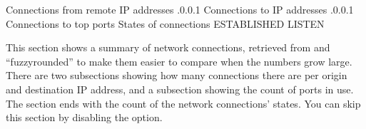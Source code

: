 \documentclass[letterpaper,10pt,english]{sphinxmanual}
\begin{document}
\begin{sphinxVerbatim}[commandchars=\\\{\}]
  Connections from remote IP addresses
    .0.0.1           
  Connections to  IP addresses
    .0.0.1           
  Connections to top   ports
                   
                   
  States of connections
    ESTABLISHED         
    LISTEN              
\end{sphinxVerbatim}

\sphinxAtStartPar
This section shows a summary of network connections, retrieved from 
and “fuzzy\sphinxhyphen{}rounded” to make them easier to compare when the numbers grow large.
There are two sub\sphinxhyphen{}sections showing how many connections there are per origin
and destination IP address, and a sub\sphinxhyphen{}section showing the count of ports in
use.  The section ends with the count of the network connections’ states.  You
can skip this section by disabling the {\hyperref[\detokenize{mariadb-system-summary:cmdoption-mariadb-system-summary-summarize-network}]{}} option.
\end{document}
